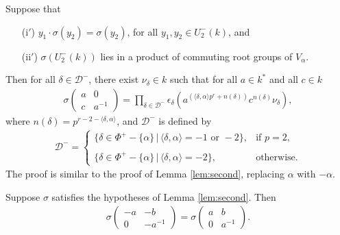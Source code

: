 \begin{remark} \label{rem:second}
	Suppose that
\begin{itemize}
\item[(i$'$)] $y_1 \cdot\sigma(y_2) = \sigma(y_2)$, for all $y_1, y_2 \in U^-_2(k)$, and
\item[(ii$'$)] $\sigma(U^-_2(k))$ lies in a product of commuting root groups of $V_\alpha$.
\end{itemize}
Then for all $\delta \in \mathcal{D}^-$, there exist $\nu_\delta \in k$ such that for all $a \in k^*$ and all $c \in k$
\begin{align*}
	\sigma\left(\begin{matrix}a & 0\\c & a^{-1}\end{matrix}\right) = \prod_{\delta\in\mathcal{D}^-}\epsilon_\delta\left(a^{(\langle\delta,\alpha\rangle p^r + n(\delta))}c^{n(\delta)}\nu_\delta\right),
\end{align*}
where $n(\delta) = p^{r-2-\langle\delta,\alpha\rangle}$, and $\mathcal{D}^-$ is defined by
\begin{align*}
\mathcal{D}^- = \left\{\begin{array}{ll}
	\{\delta \in \Phi^+-\{\alpha\} \,|\, \langle\delta,\alpha\rangle = -1\textrm{ or }-2\},&\textrm{if }p = 2, \\ \\
	\{\delta \in \Phi^+-\{\alpha\} \,|\, \langle\delta,\alpha\rangle = -2\},&\textrm{otherwise}.
\end{array}\right.
\end{align*}
The proof is similar to the proof of Lemma \ref{lem:second}, replacing $\alpha$ with $-\alpha$.
\end{remark}

\begin{corollary}\label{sigmaneg}
Suppose $\sigma$ satisfies the hypotheses of Lemma \ref{lem:second}. Then
\begin{align*}
	\sigma\left(\begin{matrix}-a & -b\\0 & -a^{-1}\end{matrix}\right) = \sigma\left(\begin{matrix}a & b\\0 & a^{-1}\end{matrix}\right).
\end{align*}
\end{corollary}

